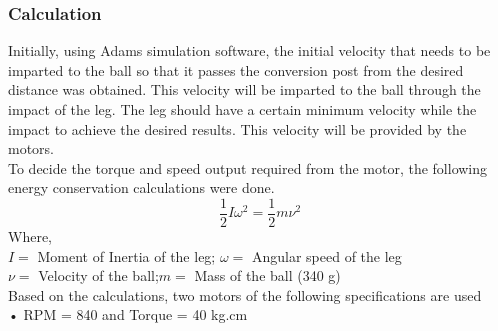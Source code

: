         \subsubsection{Calculation}
            Initially, using Adams simulation software, the initial velocity that needs to be imparted to the ball so that it passes the
            conversion post from the desired distance was obtained. This velocity will be imparted to the ball through the impact of
            the leg. The leg should have a certain minimum velocity while the impact to achieve the desired results. This velocity
            will be provided by the motors.                                                                                                         \\
            To decide the torque and speed output required from the motor, the following energy conservation calculations were
            done.   
            \textbf{$$\frac{1}{2} I {\omega}^2  =  \frac{1}{2} m {\nu}^2$$}     
            Where,                                                                                                                                  \\
            $I =$ Moment of Inertia of the leg;  $\omega =$ Angular speed of the leg                                                                \\
            $\nu =$ Velocity of the ball;$m =$ Mass of the ball (340 g)                                                                             \\
            Based on the calculations, two motors of the following specifications are used                                                          \\
            •  RPM = 840 and Torque = 40 kg.cm                                                                                                      \\

